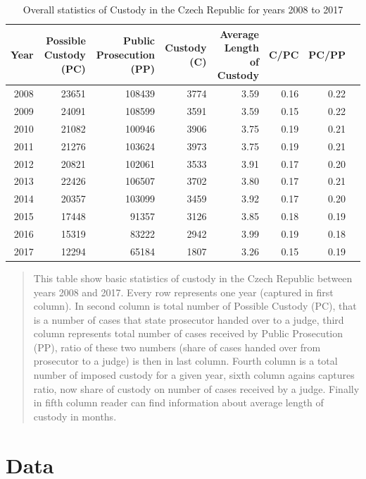 \documentclass[12pt, twoside]{book} %
\begin{document}
\newpage

\begin{table}
\centering
\begin{tabular}{rrrrrrrr}
  \hline
 Year & Possible Custody (PC) & Public Prosecution (PP) & Custody (C) & Average Length of Custody & C/PC & PC/PP \\ 
  \hline
 2008 & 23651 & 108439 & 3774 & 3.59 & 0.16 & 0.22 \\ 
   2009 & 24091 & 108599 & 3591 & 3.59 & 0.15 & 0.22 \\ 
   2010 & 21082 & 100946 & 3906 & 3.75 & 0.19 & 0.21 \\ 
   2011 & 21276 & 103624 & 3973 & 3.75 & 0.19 & 0.21 \\ 
  2012 & 20821 & 102061 & 3533 & 3.91 & 0.17 & 0.20 \\ 
   2013 & 22426 & 106507 & 3702 & 3.80 & 0.17 & 0.21 \\ 
   2014 & 20357 & 103099 & 3459 & 3.92 & 0.17 & 0.20 \\ 
   2015 & 17448 & 91357 & 3126 & 3.85 & 0.18 & 0.19 \\ 
  2016 & 15319 & 83222 & 2942 & 3.99 & 0.19 & 0.18 \\ 
   2017 & 12294 & 65184 & 1807 & 3.26 & 0.15 & 0.19 \\ 
   \hline
\end{tabular}
  \caption{Overall statistics of Custody in the Czech Republic for years 2008 to 2017 }

 \medskip
{\small 
\begin{quotation}
This table show basic statistics of custody in the Czech Republic between years 2008 and 2017. Every row represents one year (captured in first column). In second column is total number of Possible Custody (PC), that is a number of cases that state prosecutor handed over to a judge, third column represents total number of cases received by Public Prosecution (PP), ratio of these two numbers (share of cases handed over from prosecutor to a judge) is then in last column. Fourth column is a total number of imposed custody for a given year, sixth column agains captures ratio, now share of custody on number of cases received by a judge. Finally in fifth column reader can find information about average length of custody in months.
\end{quotation}
}
\end{table}






\section{Data}     %
\end{document}
